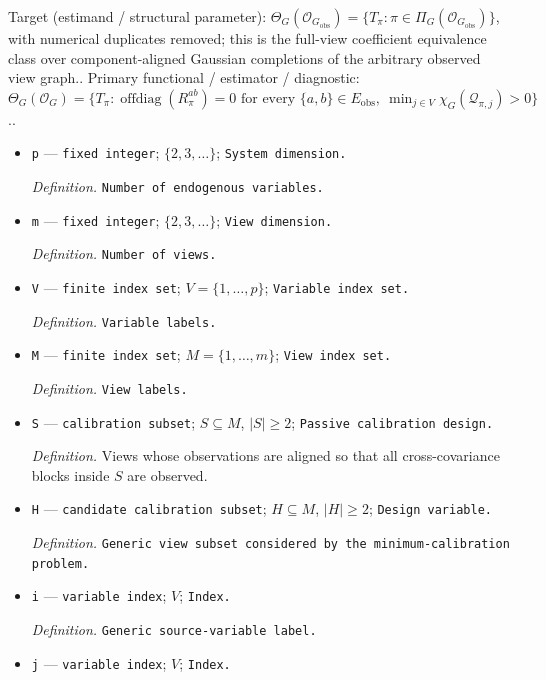 \documentclass{article}
\begin{document}
Target (estimand / structural parameter): \(\Theta_G(\mathcal O_{G_{\mathrm{obs}}})=\{T_\pi:\pi\in\Pi_G(\mathcal O_{G_{\mathrm{obs}}})\}\), with numerical duplicates removed; this is the full-view coefficient equivalence class over component-aligned Gaussian completions of the arbitrary observed view graph..
Primary functional / estimator / diagnostic: \(\Theta_G(\mathcal O_G)=\{T_\pi:\operatorname{offdiag}(R_\pi^{ab})=0\text{ for every }\{a,b\}\in E_{\mathrm{obs}},\ \min_{j\in V}\chi_G(\mathcal Q_{\pi,j})>0\}\)..
\begin{itemize}
  \item \texttt{p} --- \texttt{fixed integer}; \(\{2,3,\ldots\}\); \texttt{System dimension.}
  \par\smallskip\noindent\emph{Definition.} \texttt{Number of endogenous variables.}
  \item \texttt{m} --- \texttt{fixed integer}; \(\{2,3,\ldots\}\); \texttt{View dimension.}
  \par\smallskip\noindent\emph{Definition.} \texttt{Number of views.}
  \item \texttt{V} --- \texttt{finite index set}; \(V=\{1,\ldots,p\}\); \texttt{Variable index set.}
  \par\smallskip\noindent\emph{Definition.} \texttt{Variable labels.}
  \item \texttt{M} --- \texttt{finite index set}; \(M=\{1,\ldots,m\}\); \texttt{View index set.}
  \par\smallskip\noindent\emph{Definition.} \texttt{View labels.}
  \item \texttt{S} --- \texttt{calibration subset}; \(S\subseteq M\), \(\lvert S\rvert\ge 2\); \texttt{Passive calibration design.}
  \par\smallskip\noindent\emph{Definition.} Views whose observations are aligned so that all cross-covariance blocks inside \(S\) are observed.
  \item \texttt{H} --- \texttt{candidate calibration subset}; \(H\subseteq M\), \(\lvert H\rvert\ge 2\); \texttt{Design variable.}
  \par\smallskip\noindent\emph{Definition.} \texttt{Generic view subset considered by the minimum-\allowbreak{}calibration problem.}
  \item \texttt{i} --- \texttt{variable index}; \(V\); \texttt{Index.}
  \par\smallskip\noindent\emph{Definition.} \texttt{Generic source-\allowbreak{}variable label.}
  \item \texttt{j} --- \texttt{variable index}; \(V\); \texttt{Index.}

\end{itemize}
\end{document}
